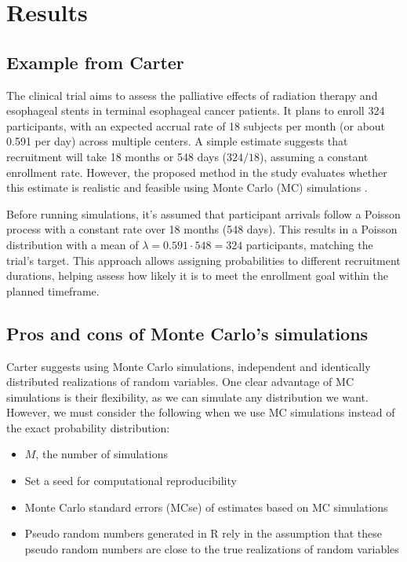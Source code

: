 

\chapter{Results}


\section{Example from Carter}

The clinical trial aims to assess the palliative effects of radiation therapy and esophageal stents in terminal esophageal cancer patients. It plans to enroll 324 participants, with an expected accrual rate of 18 subjects per month (or about 0.591 per day) across multiple centers. A simple estimate suggests that recruitment will take 18 months or 548 days ($324/18$), assuming a constant enrollment rate. However, the proposed method in the study evaluates whether this estimate is realistic and feasible using Monte Carlo (MC) simulations \citep{carter2004application}.

Before running simulations, it's assumed that participant arrivals follow a Poisson process with a constant rate over 18 months (548 days). This results in a Poisson distribution with a mean of $\lambda = 0.591 \cdot 548 = 324$ participants, matching the trial's target. This approach allows assigning probabilities to different recruitment durations, helping assess how likely it is to meet the enrollment goal within the planned timeframe.


\section{Pros and cons of Monte Carlo's simulations}

Carter suggests using Monte Carlo simulations, independent and identically distributed realizations of random variables. One clear advantage of MC simulations is their flexibility, as we can simulate any distribution we want. However, we must consider the following when we use MC simulations instead of the exact probability distribution:

\begin{itemize}
\item $M$, the number of simulations
\item Set a seed for computational reproducibility
\item Monte Carlo standard errors (MCse) of estimates based on MC simulations
\item Pseudo random numbers generated in R rely in the assumption that these pseudo random numbers are close to the true realizations of random variables \citep{held2014applied}
\end{itemize}



